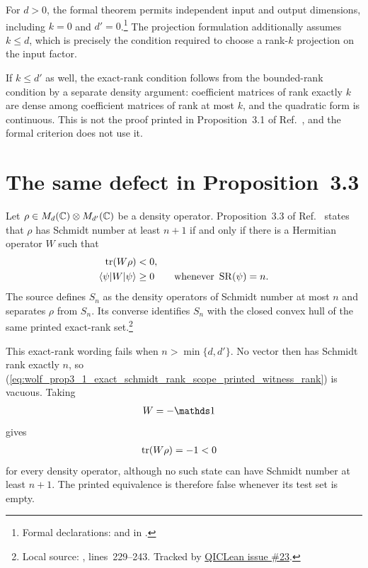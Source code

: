 \documentclass{article}
\begin{document}
For $d>0$, the formal theorem permits independent input and output dimensions,
including $k=0$ and $d'=0$.\footnote{Formal declarations:
and
in .}
The projection formulation additionally assumes $k\leq d$, which is precisely
the condition required to choose a rank-$k$ projection on the input factor.

If $k\leq d'$ as well, the exact-rank condition follows from the bounded-rank
condition by a separate density argument: coefficient matrices of rank exactly
$k$ are dense among coefficient matrices of rank at most $k$, and the
quadratic form is continuous. This is not the proof printed in Proposition~3.1
of Ref.~\cite{Wolf2012Quantum}, and the formal criterion does not use it.

\section{The same defect in Proposition~3.3}

Let $\rho\in M_d(\mathbb{C})\otimes M_{d'}(\mathbb{C})$ be a density operator.
Proposition~3.3 of Ref.~\cite{Wolf2012Quantum} states that $\rho$ has Schmidt
number at least $n+1$ if and only if there is a Hermitian operator $W$ such
that
\begin{align}
    \operatorname{tr}(W\rho)
        &<0,
    \label{eq:wolf_prop3_1_exact_schmidt_rank_scope_printed_witness_detection}\\
    \langle \psi|W|\psi\rangle
        &\geq0
        \qquad\text{whenever }\operatorname{SR}(\psi)=n.
    \label{eq:wolf_prop3_1_exact_schmidt_rank_scope_printed_witness_rank}
\end{align}
The source defines $S_n$ as the density operators of Schmidt number at most
$n$ and separates $\rho$ from $S_n$. Its converse identifies $S_n$ with the
closed convex hull of the same printed exact-rank set.\footnote{Local source:
,
lines~229--243. Tracked by
\href{https://github.com/LionSR/QICLean/issues/23}{QICLean issue \#23}.}

This exact-rank wording fails when $n>\min\{d,d'\}$. No vector then has
Schmidt rank exactly $n$, so
(\ref{eq:wolf_prop3_1_exact_schmidt_rank_scope_printed_witness_rank}) is
vacuous. Taking
\begin{align}
    W
        &=-\one
    \label{eq:wolf_prop3_1_exact_schmidt_rank_scope_vacuous_witness}
\end{align}
gives
\begin{align}
    \operatorname{tr}(W\rho)
        &=-1<0
    \label{eq:wolf_prop3_1_exact_schmidt_rank_scope_vacuous_detection}
\end{align}
for every density operator, although no such state can have Schmidt number at
least $n+1$. The printed equivalence is therefore false whenever its test set
is empty.
\end{document}
